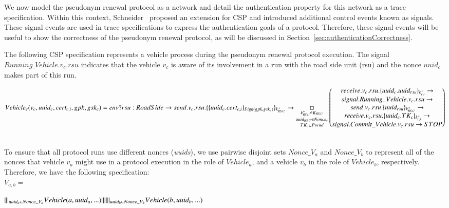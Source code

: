 \documentclass[preprint,12pt]{elsarticle}
\begin{document}
We now model the pseudonym renewal protocol as a network and detail the authentication property for this network as a trace specification. Within this context, Schneider~\cite{schneider1998verifying} proposed an extension for CSP and introduced additional control events known as signals. These signal events are used in trace specifications to express the authentication goals of a protocol. Therefore, these signal events will be useful to show the correctness of the pseudonym renewal protocol, as will be discussed in Section~\ref{sec:authenticationCorrectness}.

The following CSP specification represents a vehicle process during the pseudonym renewal protocol execution. The signal $Running\_Vehicle.v_c.rsu$ indicates that the vehicle $v_{c}$ is aware of its involvement in a run with the road side unit (rsu) and the nonce $uuid_c$ makes part of this run.
\\

\parbox[t]{1.2\textwidth}{$Vehicle_c(v_c, uuid_c, cert_{c,i}, gpk, gsk_c) = \\
env?rsu:RoadSide \rightarrow send.v_c.rsu.\{ \{uuid_c.cert_{c,i} \}_{Sign(gpk, gsk_{c})}\}_{k^{+}_{RSU}} \rightarrow \\
  \underset{TK_c \subseteq Pseud}{\underset{uuid_{RSU} \in Nonce_c}{\underset{ k^{+}_{RSU} \in K_{RSU} }{\Box}}}
  \begin{pmatrix}
    receive.v_c.rsu.\{uuid_c.uuid_{rsu}\}_{k^{+}_{c, i}} \rightarrow \\
    signal.Running\_Vehicle.v_c.rsu \rightarrow \\
    send.v_c.rsu.\{ uuid_{rsu}\}_{k^{+}_{RSU}} \rightarrow \\
    receive.v_c.rsu.\{ uuid_c.TK_c\}_{k^{+}_{c, i}} \rightarrow \\
    signal.Commit\_Vehicle.v_c.rsu \rightarrow STOP
  \end{pmatrix}
$}
\\

To ensure that all protocol runs use different nonces (\textit{uuids}), we use pairwise disjoint sets $Nonce\_V_a$ and $Nonce\_V_b$ to represent all of the nonces that vehicle $v_a$ might use in a protocol execution in the role of $Vehicle_{a}$, and a vehicle $v_{b}$ in the role of $Vehicle_b$, respectively. Therefore, we have the following specification:
\\

$V_{a, b} = $ \parbox[t]{1.2\textwidth}{$|||_{uuid_a \in Nonce\_V_a} Vehicle(a, uuid_a, ...) \\
||| \\
|||_{uuid_b \in Nonce\_V_b} Vehicle(b, uuid_b, ...)  \\
$}
\\
\end{document}
